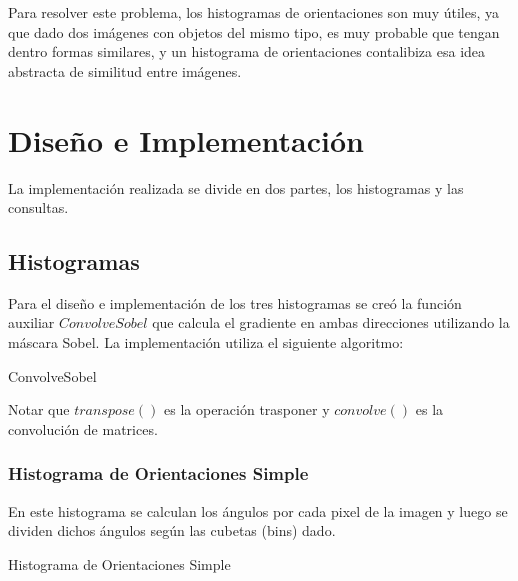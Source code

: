 \documentclass[conference]{IEEEtran}
\begin{document}
    Para resolver este problema, los histogramas de orientaciones son muy útiles, ya que dado dos imágenes con objetos del mismo tipo, es muy probable que tengan dentro formas similares, y un histograma de orientaciones contalibiza esa idea abstracta de similitud entre imágenes.
    
\section*{Diseño e Implementación}
	La implementación realizada se divide en dos partes, los histogramas y las consultas.
\subsection*{Histogramas}
	Para el diseño e implementación de los tres histogramas se creó la función auxiliar $ConvolveSobel$ que calcula el gradiente en ambas direcciones utilizando la máscara Sobel. La implementación utiliza el siguiente algoritmo: 

\begin{algorithm}[ht]
	\caption{ConvolveSobel}	
	\DontPrintSemicolon
	Notar que $transpose()$ es la operación trasponer y $convolve()$ es la convolución de matrices.
\end{algorithm}


\subsubsection*{Histograma de Orientaciones Simple}
	En este histograma se calculan los ángulos por cada pixel de la imagen y luego se dividen dichos ángulos según las cubetas (bins) dado.
	\begin{algorithm}[ht]
		\caption{Histograma de Orientaciones Simple}	
		\DontPrintSemicolon
		
		\end{algorithm} 
	
\end{document}
